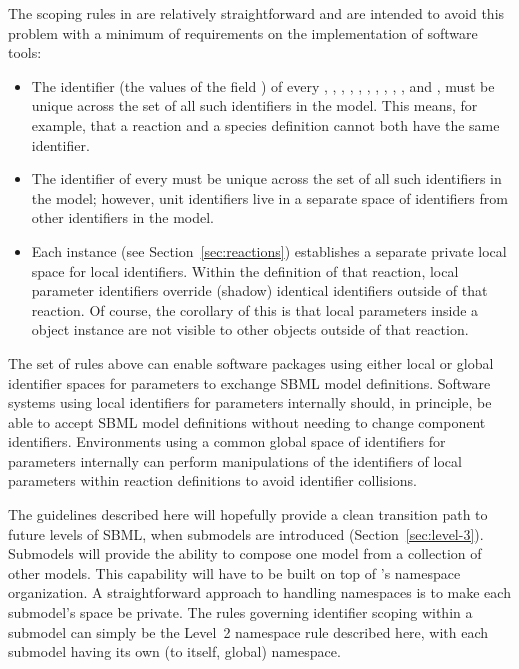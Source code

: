 The scoping rules in \sbmltwo are relatively
straightforward and are intended to avoid this problem with a
minimum of requirements on the implementation of software tools:
\begin{itemize}
  
\item The identifier (\ie the values of the field ) of
  every \FunctionDefinition, \CompartmentType, \SpeciesType,
  \Compartment, \Species, \Parameter, \Reaction,
  \SpeciesReference, \ModifierSpeciesReference, \Event, and
  \Model, must be unique across the set of all such identifiers in
  the model.  This means, for example, that a reaction and a
  species definition cannot both have the same identifier.

\item The identifier of every \UnitDefinition must be unique
  across the set of all such identifiers in the model; however,
  unit identifiers live in a separate space of identifiers from
  other identifiers in the model.
  
\item Each \Reaction instance (see Section~\ref{sec:reactions})
  establishes a separate private local space for local \Parameter
  identifiers.  Within the definition of that reaction, local
  parameter identifiers override (shadow) identical identifiers
  outside of that reaction.  Of course, the corollary of this is
  that local parameters inside a \Reaction object instance are not
  visible to other objects outside of that reaction.

\end{itemize}
The set of rules above can enable software packages using either
local or global identifier spaces for parameters to exchange SBML
model definitions.  Software systems using local identifiers for
parameters internally should, in principle, be able to accept SBML
model definitions without needing to change component identifiers.
Environments using a common global space of identifiers for
parameters internally can perform manipulations of the identifiers
of local parameters within reaction definitions to avoid
identifier collisions.

The guidelines described here will hopefully provide a clean
transition path to future levels of SBML, when submodels are
introduced (Section~\ref{sec:level-3}).  Submodels will provide
the ability to compose one model from a collection of other
models.  This capability will have to be built on top of
\sbmltwo's namespace organization.  A straightforward approach to
handling namespaces is to make each submodel's space be private.
The rules governing identifier scoping within a submodel can
simply be the Level~2 namespace rule described here, with each
submodel having its own (to itself, global) namespace.


